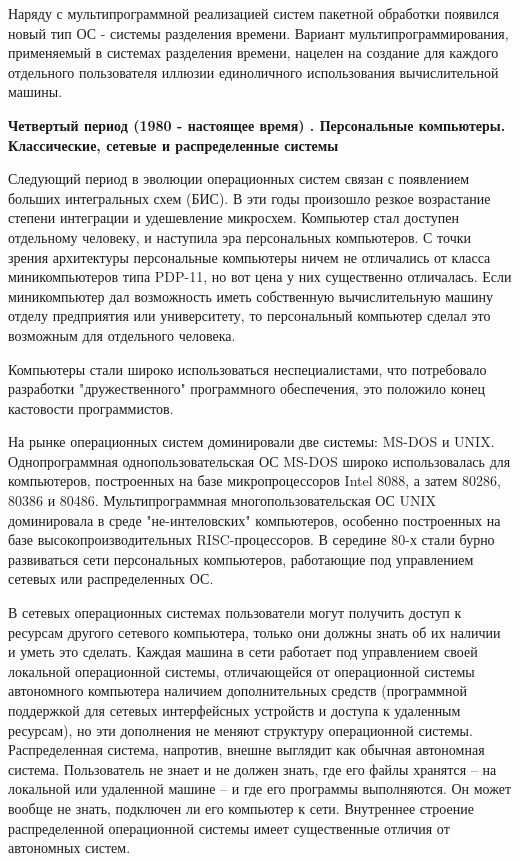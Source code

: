 Наряду с мультипрограммной реализацией систем пакетной обработки появился новый тип ОС - системы разделения времени. Вариант мультипрограммирования, применяемый в системах разделения времени, нацелен на создание для каждого отдельного пользователя иллюзии единоличного использования вычислительной машины.

\textbf{Четвертый период (1980 - настоящее время) . Персональные компьютеры. Классические, сетевые и распределенные системы}

Следующий период в эволюции операционных систем связан с появлением больших интегральных схем (БИС). В эти годы произошло резкое возрастание степени интеграции и удешевление микросхем. Компьютер стал доступен отдельному человеку, и наступила эра персональных компьютеров. С точки зрения архитектуры персональные компьютеры ничем не отличались от класса миникомпьютеров типа PDP-11, но вот цена у них существенно отличалась. Если миникомпьютер дал возможность иметь собственную вычислительную машину отделу предприятия или университету, то персональный компьютер сделал это возможным для отдельного человека.

Компьютеры стали широко использоваться неспециалистами, что потребовало разработки "дружественного" программного обеспечения, это положило конец кастовости программистов.

На рынке операционных систем доминировали две системы: MS-DOS и UNIX. Однопрограммная однопользовательская ОС MS-DOS широко использовалась для компьютеров, построенных на базе микропроцессоров Intel 8088, а затем 80286, 80386 и 80486. Мультипрограммная многопользовательская ОС UNIX доминировала в среде "не-интеловских" компьютеров, особенно построенных на базе высокопроизводительных RISC-процессоров.
В середине 80-х стали бурно развиваться сети персональных компьютеров, работающие под управлением сетевых или распределенных ОС.

В сетевых операционных системах пользователи могут получить доступ к ресурсам другого сетевого компьютера, только они должны знать об их наличии и уметь это сделать. Каждая машина в сети работает под управлением своей локальной операционной системы, отличающейся от операционной системы автономного компьютера наличием дополнительных средств (программной поддержкой для сетевых интерфейсных устройств и доступа к удаленным ресурсам), но эти дополнения не меняют структуру операционной системы.
Распределенная система, напротив, внешне выглядит как обычная автономная система. Пользователь не знает и не должен знать, где его файлы хранятся – на локальной или удаленной машине – и где его программы выполняются. Он может вообще не знать, подключен ли его компьютер к сети. Внутреннее строение распределенной операционной системы имеет существенные отличия от автономных систем.
